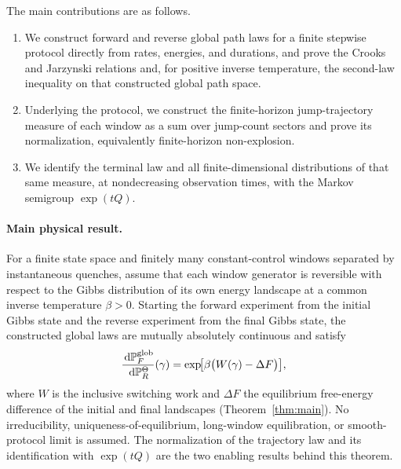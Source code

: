 The main contributions are as follows.

\begin{enumerate}[leftmargin=*,label=(\arabic*)]
  \item We construct forward and reverse global path laws for a finite stepwise protocol directly from rates, energies, and durations, and prove the Crooks and Jarzynski relations and, for positive inverse temperature, the second-law inequality on that constructed global path space.

  \item Underlying the protocol, we construct the finite-horizon jump-trajectory measure of each window as a sum over jump-count sectors and prove its normalization, equivalently finite-horizon non-explosion.

  \item We identify the terminal law and all finite-dimensional distributions of that same measure, at nondecreasing observation times, with the Markov semigroup $\exp(tQ)$.
\end{enumerate}

\paragraph{Main physical result.}
For a finite state space and finitely many constant-control windows separated by instantaneous quenches, assume that each window generator is reversible with respect to the Gibbs distribution of its own energy landscape at a common inverse temperature $\beta>0$. Starting the forward experiment from the initial Gibbs state and the reverse experiment from the final Gibbs state, the constructed global laws are mutually absolutely continuous and satisfy
\[
  \frac{\,\mathrm{d}\mathbb{P}_F^{\mathrm{glob}}}{\,\mathrm{d}\mathbb{P}_R^{\Theta}}(\gamma)
  =\exp\!\bigl[\beta\bigl(W(\gamma)-\Delta F\bigr)\bigr],
\]
where $W$ is the inclusive switching work and $\Delta F$ the equilibrium free-energy difference of the initial and final landscapes (Theorem~\ref{thm:main}). No irreducibility, uniqueness-of-equilibrium, long-window equilibration, or smooth-protocol limit is assumed. The normalization of the trajectory law and its identification with $\exp(tQ)$ are the two enabling results behind this theorem.

